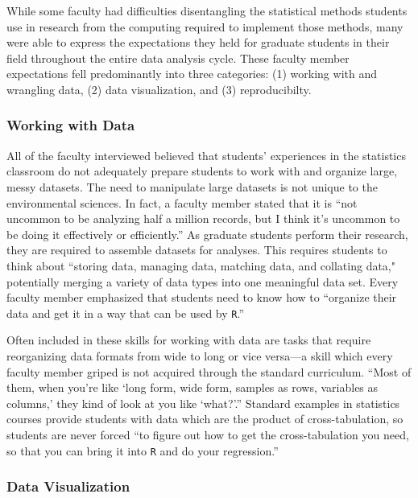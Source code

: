 \documentclass[12pt]{article}
\begin{document}
\quad While some faculty had difficulties disentangling the statistical methods
students use in research from the computing required to implement those methods,
many were able to express the expectations they held for graduate students in
their field throughout the entire data analysis cycle. These faculty member
expectations fell predominantly into three categories: (1) working with and
wrangling data, (2) data visualization, and (3) reproducibilty.

\subsubsection{Working with Data}  

\quad All of the faculty interviewed believed that students' experiences in the
statistics classroom do not adequately prepare students to work with and
organize large, messy datasets. The need to manipulate large datasets is not
unique to the environmental sciences. In fact, a faculty member stated that it
is ``not uncommon to be analyzing half a million records, but I think it's
uncommon to be doing it effectively or efficiently.'' As graduate students
perform their research, they are required to assemble datasets for analyses.
This requires students to think about ``storing data, managing data, matching
data, and collating data," potentially merging a variety of data types into one
meaningful data set. Every faculty member emphasized that students need to know
how to ``organize their data and get it in a way that can be used by 
\texttt{R}.'' 
  
\quad Often included in these skills for working with data are tasks that 
require reorganizing data formats from wide to long or vice versa---a skill 
which every faculty member griped is not acquired through the standard 
curriculum. ``Most of them, when you're like `long form, wide form, samples as 
rows, variables as columns,' they kind of look at you like `what?'.'' Standard 
examples in statistics courses provide students with data which are the product
of cross-tabulation, so students are never forced ``to figure out how to get the
cross-tabulation you need, so that you can bring it into \texttt{R} and do your
regression.''

\subsubsection{Data Visualization} 
\end{document}
